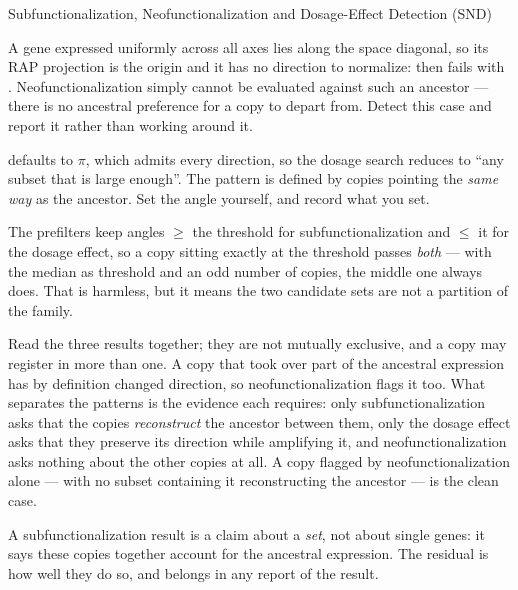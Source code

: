 \begin{recipe}[label=rec:snd]{Subfunctionalization, Neofunctionalization and
  Dosage-Effect Detection (SND)}
\begin{pitfall}
  A gene expressed uniformly across all axes lies along the space diagonal, so
  its RAP projection is the origin and it has no direction to normalize:
   then fails with
  . Neofunctionalization simply cannot be
  evaluated against such an ancestor --- there is no ancestral preference for a
  copy to depart from. Detect this case and report it rather than working
  around it.
\end{pitfall}

\begin{pitfall}
   defaults to $\pi$, which admits every direction, so the
  dosage search reduces to ``any subset that is large enough''. The pattern is
  defined by copies pointing the \emph{same way} as the ancestor. Set the angle
  yourself, and record what you set.
\end{pitfall}

\begin{pitfall}
  The prefilters keep angles $\geq$ the threshold for subfunctionalization and
  $\leq$ it for the dosage effect, so a copy sitting exactly at the threshold
  passes \emph{both} --- with the median as threshold and an odd number of
  copies, the middle one always does. That is harmless, but it means the two
  candidate sets are not a partition of the family.
\end{pitfall}

\begin{interpretation}
  Read the three results together; they are not mutually exclusive, and a copy
  may register in more than one. A copy that took over part of the ancestral
  expression has by definition changed direction, so neofunctionalization flags
  it too. What separates the patterns is the evidence each requires: only
  subfunctionalization asks that the copies \emph{reconstruct} the ancestor
  between them, only the dosage effect asks that they preserve its direction
  while amplifying it, and neofunctionalization asks nothing about the other
  copies at all. A copy flagged by neofunctionalization alone --- with no
  subset containing it reconstructing the ancestor --- is the clean case.

  A subfunctionalization result is a claim about a \emph{set}, not about single
  genes: it says these copies together account for the ancestral expression.
  The residual is how well they do so, and belongs in any report of the result.


\end{interpretation}
\end{recipe}

